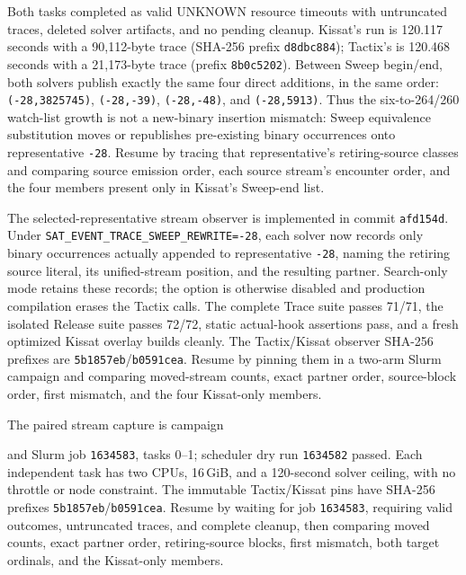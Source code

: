 \documentclass[11pt]{article}
\newcommand{\code}[1]{\texttt{#1}}
\newcommand{\artifact}[1]{\path{#1}}
\begin{document}
Both tasks completed as valid UNKNOWN resource timeouts with untruncated
traces, deleted solver artifacts, and no pending cleanup. Kissat's run is
120.117 seconds with a 90,112-byte trace (SHA-256 prefix \code{d8dbc884});
Tactix's is 120.468 seconds with a 21,173-byte trace (prefix
\code{8b0c5202}). Between Sweep begin/end, both solvers publish exactly the
same four direct additions, in the same order:
\code{(-28,3825745)}, \code{(-28,-39)}, \code{(-28,-48)}, and
\code{(-28,5913)}. Thus the six-to-264/260 watch-list growth is not a
new-binary insertion mismatch: Sweep equivalence substitution moves or
republishes pre-existing binary occurrences onto representative \code{-28}.
Resume by tracing that representative's retiring-source classes and comparing
source emission order, each source stream's encounter order, and the four
members present only in Kissat's Sweep-end list.

The selected-representative stream observer is implemented in commit
\code{afd154d}. Under \code{SAT\_EVENT\_TRACE\_SWEEP\_REWRITE=-28}, each
solver now records only binary occurrences actually appended to representative
\code{-28}, naming the retiring source literal, its unified-stream position,
and the resulting partner. Search-only mode retains these records; the option
is otherwise disabled and production compilation erases the Tactix calls. The
complete Trace suite passes 71/71, the isolated Release suite passes 72/72,
static actual-hook assertions pass, and a fresh optimized Kissat overlay builds
cleanly. The Tactix/Kissat observer SHA-256 prefixes are
\code{5b1857eb}/\code{b0591cea}. Resume by pinning them in a two-arm Slurm
campaign and comparing moved-stream counts, exact partner order, source-block
order, first mismatch, and the four Kissat-only members.

The paired stream capture is campaign
\begin{center}\small\artifact{20260819-1016-tierd-rank22-sweep-streams}\end{center}
and Slurm job \code{1634583}, tasks 0--1; scheduler dry run \code{1634582}
passed. Each independent task has two CPUs, 16\,GiB, and a 120-second solver
ceiling, with no throttle or node constraint. The immutable Tactix/Kissat pins
have SHA-256 prefixes \code{5b1857eb}/\code{b0591cea}. Resume by waiting for
job \code{1634583}, requiring valid outcomes, untruncated traces, and complete
cleanup, then comparing moved counts, exact partner order, retiring-source
blocks, first mismatch, both target ordinals, and the Kissat-only members.
\end{document}

